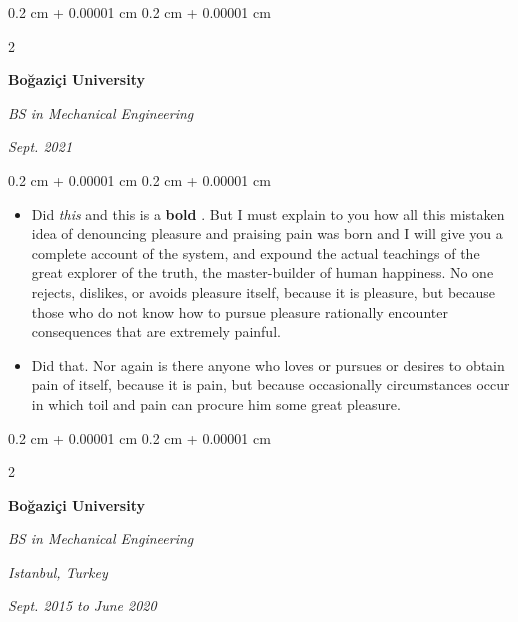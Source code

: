 \documentclass[10pt, letterpaper]{article}
\newenvironment{highlights}{
    \begin{itemize}[
        topsep=0.10 cm,
        parsep=0.10 cm,
        partopsep=0pt,
        itemsep=0pt,
        leftmargin=0.4 cm + 10pt
    ]
}{
    \end{itemize}
} %
\newenvironment{onecolentry}{
    \begin{adjustwidth}{
        0.2 cm + 0.00001 cm
    }{
        0.2 cm + 0.00001 cm
    }
}{
    \end{adjustwidth}
} %
\newenvironment{twocolentry}[2][]{
    \onecolentry
    \def\secondColumn{#2}
    \setcolumnwidth{\fill, 4.5 cm}
    \begin{paracol}{2}
}{
    \switchcolumn \raggedleft \secondColumn
    \end{paracol}
    \endonecolentry
} %
\let\hrefWithoutArrow\href
\renewcommand{\href}[2]{\hrefWithoutArrow{#1}{\mbox{\ifthenelse{\equal{#2}{}}{ }{#2 }\raisebox{.15ex}{\footnotesize \faExternalLink*}}}}
\begin{document}
        \vspace{0.2 cm-3px}

        \begin{twocolentry}{
            
            
        \textit{Sept. 2021}}
            \textbf{Boğaziçi University}

            \textit{BS in Mechanical Engineering}
        \end{twocolentry}

        \vspace{0.10 cm-3px}
        \begin{onecolentry}
            \begin{highlights}
                \item Did \textit{this} and this is a \textbf{bold} \href{https://example.com}{link}. But I must explain to you how all this mistaken idea of denouncing pleasure and praising pain was born and I will give you a complete account of the system, and expound the actual teachings of the great explorer of the truth, the master-builder of human happiness. No one rejects, dislikes, or avoids pleasure itself, because it is pleasure, but because those who do not know how to pursue pleasure rationally encounter consequences that are extremely painful.
                \item Did that. Nor again is there anyone who loves or pursues or desires to obtain pain of itself, because it is pain, but because occasionally circumstances occur in which toil and pain can procure him some great pleasure.
            \end{highlights}
        \end{onecolentry}


        \vspace{0.2 cm-3px}

        \begin{twocolentry}{
        \textit{Istanbul, Turkey}    
            
        \textit{Sept. 2015 to June 2020}}
            \textbf{Boğaziçi University}

            \textit{BS in Mechanical Engineering}
        \end{twocolentry}
\end{document}

